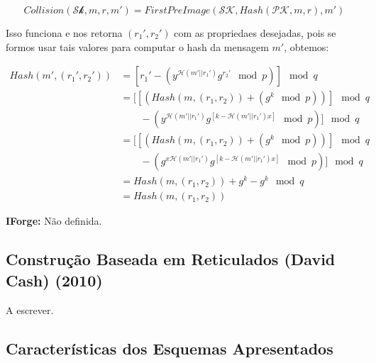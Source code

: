\documentclass[a4paper]{article}
\begin{document}
$$ Collision(\mathcal{Sk}, m, r, m') = FirstPreImage(\mathcal{SK},
Hash(\mathcal{PK}, m, r), m')
$$

Isso funciona e nos retorna $(r_1', r_2')$ com as propriedaes
desejadas, pois se formos usar tais valores para computar o hash da
mensagem $m'$, obtemos:

\begin{equation}
\begin{split}
  Hash(m', (r_1', r_2')) &= \left[r_1'-(y^{\mathcal{H}(m'||r_1')}g^{r_2'} \mod p)\right] \mod q\\
  &=\big[\left[(Hash(m, (r_1, r_2)) + (g^k \mod p))\right] \mod q\\
    &\qquad-(y^{\mathcal{H}(m'||r_1')}g^{[k-\mathcal{H}(m'||r_1')x]} \mod p)\big] \mod q\\
  &=\big[\left[(Hash(m, (r_1, r_2)) + (g^k \mod p))\right] \mod q\\
    &\qquad-(g^{x\mathcal{H}(m'||r_1')}g^{[k-\mathcal{H}(m'||r_1')x]} \mod p)\big] \mod q\\
  &= Hash(m, (r_1, r_2)) + g^k - g^k \mod q\\
  &= Hash(m, (r_1, r_2))
\end{split}
\end{equation}

\textbf{IForge: }Não definida.

%




\subsection{Construção Baseada em Reticulados (David Cash)
  (2010)\cite{reticulado}}

A escrever.

\subsection{Características dos Esquemas Apresentados}
\end{document}
